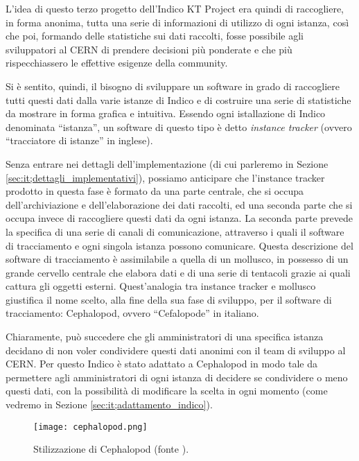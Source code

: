     L'idea di questo terzo progetto dell'Indico KT Project era quindi di raccogliere, in forma anonima, tutta una serie di informazioni di utilizzo di ogni istanza, così che poi, formando delle statistiche sui dati raccolti, fosse possibile agli sviluppatori al \ac{CERN} di prendere decisioni più ponderate e che più rispecchiassero le effettive esigenze della community.
    
    Si è sentito, quindi, il bisogno di sviluppare un software in grado di raccogliere tutti questi dati dalla varie istanze di Indico e di costruire una serie di statistiche da mostrare in forma grafica e intuitiva. Essendo ogni istallazione di Indico denominata ``istanza'', un software di questo tipo è detto \textit{instance tracker} (ovvero ``tracciatore di istanze'' in inglese).
    
    Senza entrare nei dettagli dell'implementazione (di cui parleremo in Sezione \ref{sec:it;dettagli_implementativi}), possiamo anticipare che l'instance tracker prodotto in questa fase è formato da una parte centrale, che si occupa dell'archiviazione e dell'elaborazione dei dati raccolti, ed una seconda parte che si occupa invece di raccogliere questi dati da ogni istanza. La seconda parte prevede la specifica di una serie di canali di comunicazione, attraverso i quali il software di tracciamento e ogni singola istanza possono comunicare. Questa descrizione del software di tracciamento è assimilabile a quella di un mollusco, in possesso di un grande cervello centrale che elabora dati e di una serie di tentacoli grazie ai quali cattura gli oggetti esterni. Quest'analogia tra instance tracker e mollusco giustifica il nome scelto, alla fine della sua fase di sviluppo, per il software di tracciamento: Cephalopod, ovvero ``Cefalopode'' in italiano.
    
    Chiaramente, può succedere che gli amministratori di una specifica istanza decidano di non voler condividere questi dati anonimi con il team di sviluppo al \ac{CERN}. Per questo Indico è stato adattato a Cephalopod in modo tale da permettere agli amministratori di ogni istanza di decidere se condividere o meno questi dati, con la possibilità di modificare la scelta in ogni momento (come vedremo in Sezione \ref{sec:it;adattamento_indico}).
    
	\begin{figure}[h!]
		\begin{center}
			\texttt{[image: cephalopod.png]}
		\end{center}
		\caption[Stilizzazione di Cephalopod]{Stilizzazione di Cephalopod (fonte \cite{papini:kt}).}
		\label{fig:cephalopod}
	\end{figure}
	
